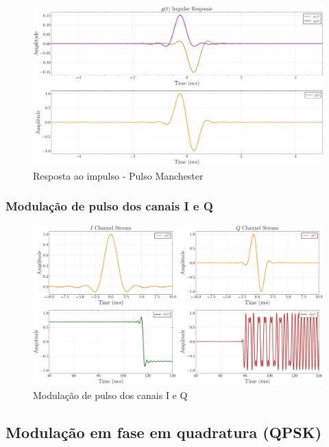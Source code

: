 \begin{figure}[H]
	\centering
	\caption{Resposta ao impulso - Pulso Manchester}\label{fig:impulse_response_man}
	\includegraphics[width=\linewidth]{assets/cap3/example_formatter_impulse_man.pdf}
\end{figure}


\subsubsection{Modulação de pulso dos canais I e Q}


\begin{figure}[H]
	\centering
	\caption{Modulação de pulso dos canais I e Q}\label{fig:transmitter_formatter_time}
	\includegraphics[width=\linewidth]{assets/cap3/transmitter_formatter_time.pdf}
\end{figure}


\subsection{Modulação em fase em quadratura (QPSK)}\label{sec:qpsk}

